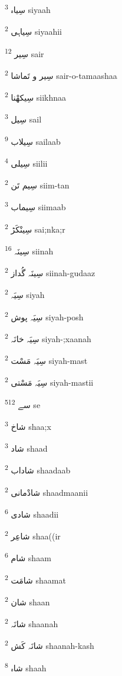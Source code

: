 \documentclass[12pt]{article}
\begin{document}
\begin{RTL}
\begin{multicols}{5}
{\ur سِیاہ}   \textsuperscript{3} siyaah

{\ur سِیاہی}   \textsuperscript{2} siyaahii

{\ur سِیر}   \textsuperscript{12} sair

{\ur سِیر و تَماشا}   \textsuperscript{2} sair-o-tamaashaa

{\ur سِیکھْنا}   \textsuperscript{2} siikhnaa

{\ur سِیل}   \textsuperscript{3} sail

{\ur سِیلاب}   \textsuperscript{9} sailaab

{\ur سِیلی}   \textsuperscript{4} siilii

{\ur سِیم تَن}   \textsuperscript{2} siim-tan

{\ur سِیماب}   \textsuperscript{3} siimaab

{\ur سِینْکَڑ}   \textsuperscript{2} sai;nka;r

{\ur سِینَہ}   \textsuperscript{16} siinah

{\ur سِینَہ گُداز}   \textsuperscript{2} siinah-gudaaz

{\ur سِیَہ}   \textsuperscript{2} siyah

{\ur سِیَہ پوش}   \textsuperscript{2} siyah-posh

{\ur سِیَہ خانَہ}   \textsuperscript{2} siyah-;xaanah

{\ur سِیَہ مَسْت}   \textsuperscript{2} siyah-mast

{\ur سِیَہ مَسْتی}   \textsuperscript{2} siyah-mastii

{\ur سے}   \textsuperscript{512} se

{\ur شاخ}   \textsuperscript{3} shaa;x

{\ur شاد}   \textsuperscript{3} shaad

{\ur شاداب}   \textsuperscript{2} shaadaab

{\ur شادْمانی}   \textsuperscript{2} shaadmaanii

{\ur شادی}   \textsuperscript{6} shaadii

{\ur شاعِر}   \textsuperscript{2} shaa((ir

{\ur شام}   \textsuperscript{6} shaam

{\ur شامَت}   \textsuperscript{2} shaamat

{\ur شان}   \textsuperscript{2} shaan

{\ur شانَہ}   \textsuperscript{2} shaanah

{\ur شانَہ کَش}   \textsuperscript{2} shaanah-kash

{\ur شاہ}   \textsuperscript{8} shaah


\end{multicols}
\end{RTL}
\end{document}
